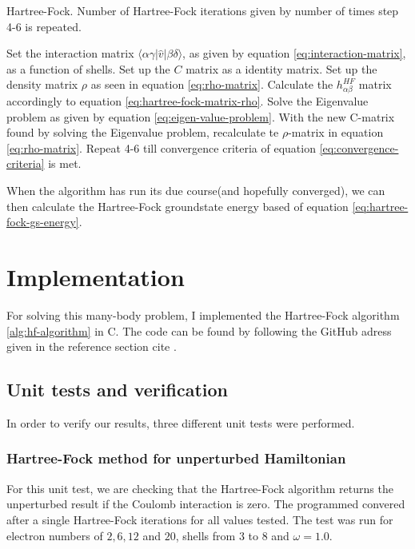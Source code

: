 \documentclass[11pt]{article}
\newcommand{\husk}[1]{\color{red} #1 \color{black}}
\newcommand{\CC}{C\nolinebreak\hspace{-.05em}\raisebox{.4ex}{\tiny\bf +}\nolinebreak\hspace{-.10em}\raisebox{.4ex}{\tiny\bf +}}
\def\CC{{C\nolinebreak[4]\hspace{-.05em}\raisebox{.4ex}{\tiny\bf ++}}}
\begin{document}
\begin{algorithm}[H]
\caption{Hartree-Fock. Number of Hartree-Fock iterations given by number of times step 4-6 is repeated.}
\label{alg:hf-algorithm}
\begin{algorithmic}[1]
\State Set the interaction matrix $\langle \alpha \gamma |\hat{v}| \beta \delta \rangle$, as given by equation \eqref{eq:interaction-matrix}, as a function of shells.
\State Set up the $C$ matrix as a identity matrix.
\State Set up the density matrix $\rho$ as seen in equation \eqref{eq:rho-matrix}.
\State Calculate the $h^{HF}_{\alpha\beta}$ matrix accordingly to equation \eqref{eq:hartree-fock-matrix-rho}.
\State Solve the Eigenvalue problem as given by equation \eqref{eq:eigen-value-problem}.
\State With the new C-matrix found by solving the Eigenvalue problem, recalculate te $\rho$-matrix in equation \eqref{eq:rho-matrix}.
\State Repeat 4-6 till convergence criteria of equation \eqref{eq:convergence-criteria} is met.
\end{algorithmic}
\end{algorithm}

When the algorithm has run its due course(and hopefully converged), we can then calculate the Hartree-Fock groundstate energy based of equation \eqref{eq:hartree-fock-gs-energy}.

\section{Implementation}
For solving this many-body problem, I implemented the Hartree-Fock algorithm \ref{alg:hf-algorithm} in \CC. The code can be found by following the GitHub adress given in the reference section \husk{cite}.

\subsection{Unit tests and verification}
In order to verify our results, three different unit tests were performed.

\subsubsection{Hartree-Fock method for unperturbed Hamiltonian}
For this unit test, we are checking that the Hartree-Fock algorithm returns the unperturbed result if the Coulomb interaction is zero. The programmed convered after a single Hartree-Fock iterations for all values tested. The test was run for electron numbers of $2,6,12$ and $20$, shells from $3$ to $8$ and $\omega=1.0$.
\end{document}

